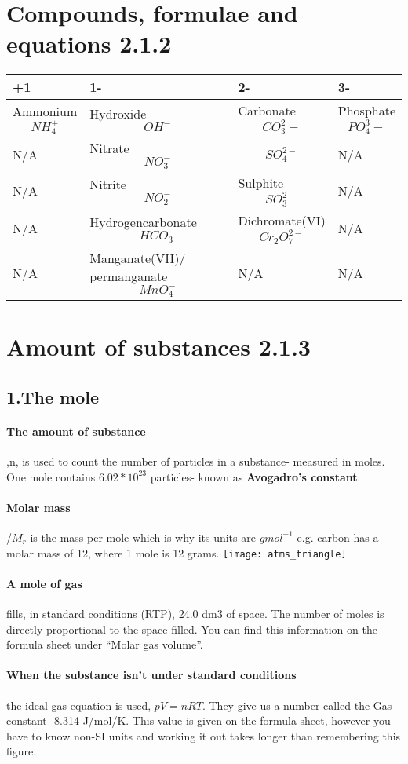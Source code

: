 \section{Compounds, formulae and equations 2.1.2}
\begin{tabular}{ |p{3cm}||p{4cm}||p{3cm}||p{3cm}|  }
 \hline
 +1    & 1- &2-&3-\\
 \hline
 Ammonium \[ NH_4^+ \]    & Hydroxide \[OH^-\]    &Carbonate \[CO_3^ 2-\]& Phosphate \[PO_4^ 3-\]\\
 N/A& Nitrate \[NO_3^-\]  & \[SO_4^{2-}\]  & N/A\\
 N/A& Nitrite \[NO_2^-\]  & Sulphite \[SO_3^{2-}\]& N/A\\
 \hline
 N/A & Hydrogencarbonate \[HCO_3^-\] & Dichromate(VI) \[Cr_2O_7^{2-}\] & N/A\\
 \hline
 N/A & Manganate(VII)/ permanganate \[MnO_4^-\] &N/A&N/A\\
 \hline
\end{tabular}
\section{Amount of substances 2.1.3}
\subsection{1.The mole}
\paragraph{The amount of substance},n, is used to count the number of particles in a substance- measured in moles. One mole contains \textbf{\(6.02*10^{23}\)} particles- known as \textbf{Avogadro's constant}.
\paragraph{Molar mass} /\(M_r\) is the mass per mole which is why its units are \(gmol^{-1}\) e.g. carbon has a molar mass of 12, where 1 mole is 12 grams.
\newline\texttt{[image: atms\_triangle]}
\paragraph{A mole of gas} fills, in standard conditions (RTP), 24.0 dm3 of space. The number of moles is directly proportional to the space filled. You can find this information on the formula sheet under “Molar gas volume”.
\paragraph{When the substance isn’t under standard conditions} the ideal gas equation is used, \(pV=nRT\). They give us a number called the Gas constant- 8.314 J/mol/K. This value is given on the formula sheet, however you have to know non-SI units and working it out takes longer than remembering this figure.
